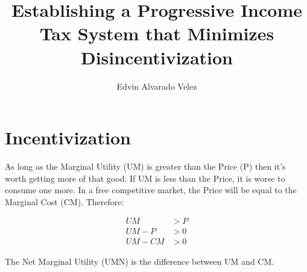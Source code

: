 \documentclass[12pt,letterpaper]{article}
\author{Edvin Alvarado Velez}
\title{Establishing a Progressive Income Tax System that Minimizes Disincentivization}
\begin{document}
	
		
		
		
		
	\maketitle
	
		
	\section{Incentivization} 
	
		As long as the Marginal Utility (UM) is greater than the Price (P) then it's worth getting more of that good. If UM is less than the Price, it is worse to consume one more. In a free competitive market, the Price will be equal to the Marginal Cost (CM). Therefore:

		\begin{align*}
			UM&>P \\
			UM-P&>0 \\
			UM-CM&>0
		\end{align*}

		The Net Marginal Utility (UMN) is the difference between UM and CM.
\end{document}
